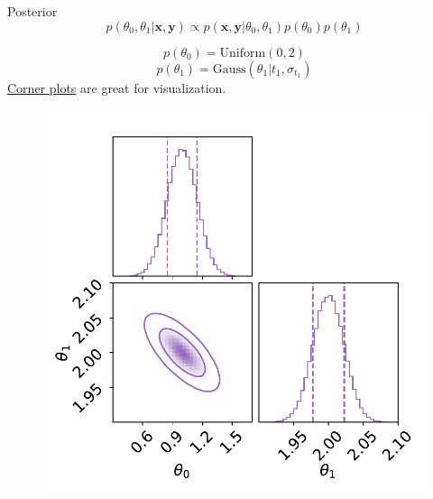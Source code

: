 \documentclass[
aspectratio=169,
14pt,
professionalfonts
]{beamer}
\begin{document}
\begin{frame}{Posterior}
\vspace{-1cm}
    $$p(\theta_0, \theta_1|\mathbf{x}, \mathbf{y}) \propto p(\mathbf{x}, \mathbf{y}|\theta_0, \theta_1) p(\theta_0)p(\theta_1)$$
    \begin{minipage}{0.49\linewidth}
        $$p(\theta_0) = \text{Uniform}(0,2)$$
        $$p(\theta_1) = \text{Gauss}(\theta_1 | t_1, \sigma_{t_1})$$
        \href{https://corner.readthedocs.io/en/latest/}{Corner plots} are great for visualization.
    \end{minipage}
    \begin{minipage}{0.49\linewidth}
    \begin{figure}
        \centering
        \includegraphics[width=0.9\linewidth]{../plots/posterior.pdf}
    \end{figure}
    \end{minipage}
\end{frame}
\end{document}
